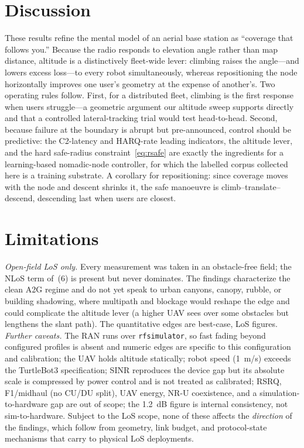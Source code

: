 \documentclass[10pt, conference]{IEEEtran}
\begin{document}
\section{Discussion}
These results refine the mental model of an aerial base station as ``coverage that follows you.'' Because the radio responds to elevation angle rather than map distance, altitude is a distinctively fleet-wide lever: climbing raises the angle---and lowers excess loss---to every robot simultaneously, whereas repositioning the node horizontally improves one user's geometry at the expense of another's. Two operating rules follow. First, for a distributed fleet, climbing is the first response when users struggle---a geometric argument our altitude sweep supports directly and that a controlled lateral-tracking trial would test head-to-head. Second, because failure at the boundary is abrupt but pre-announced, control should be predictive: the C2-latency and HARQ-rate leading indicators, the altitude lever, and the hard safe-radius constraint~\eqref{eq:rsafe} are exactly the ingredients for a learning-based nomadic-node controller, for which the labelled corpus collected here is a training substrate. A corollary for repositioning: since coverage moves with the node and descent shrinks it, the safe manoeuvre is climb--translate--descend, descending last when users are closest.

\section{Limitations}
\emph{Open-field LoS only.} Every measurement was taken in an obstacle-free field; the NLoS term of~(6) is present but never dominates. The findings characterize the clean A2G regime and do not yet speak to urban canyons, canopy, rubble, or building shadowing, where multipath and blockage would reshape the edge and could complicate the altitude lever (a higher UAV sees over some obstacles but lengthens the slant path). The quantitative edges are best-case, LoS figures. \emph{Further caveats.} The RAN runs over \texttt{rfsimulator}, so fast fading beyond configured profiles is absent and numeric edges are specific to this configuration and calibration; the UAV holds altitude statically; robot speed (1~m/s) exceeds the TurtleBot3 specification; SINR reproduces the device gap but its absolute scale is compressed by power control and is not treated as calibrated; RSRQ, F1/midhaul (no CU/DU split), UAV energy, NR-U coexistence, and a simulation-to-hardware gap are out of scope; the 1.2~dB figure is internal consistency, not sim-to-hardware. Subject to the LoS scope, none of these affects the \emph{direction} of the findings, which follow from geometry, link budget, and protocol-state mechanisms that carry to physical LoS deployments.
\end{document}
